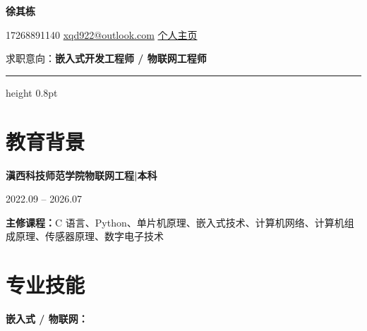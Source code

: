 \documentclass[10pt,a4paper]{article}
\begin{document}
\begin{center}
    {\fontsize{24}{28}\selectfont\bfseries\color{primary} 徐其栋}

    \vspace{0.1em}

    {\color{graytext}
    \faPhone\hspace{0.3em}17268891140
    \hspace{1.2em}
    \faEnvelope\hspace{0.3em}\href{mailto:xqd922@outlook.com}{xqd922@outlook.com}
    \hspace{1.2em}
    \faGlobe\hspace{0.3em}\href{https://1001.pp.ua}{个人主页}}

    \vspace{0.3em}

    {\color{darktext} 求职意向：\textbf{\color{primary}嵌入式开发工程师 / 物联网工程师}}
\end{center}

\vspace{0.2em}
{\color{rulecolor}\hrule height 0.8pt}

\section{\faGraduationCap\hspace{0.4em}教育背景}

{\bfseries 滇西科技师范学院}\hfill{\bfseries 物联网工程\hspace{0.3em}|\hspace{0.3em}本科}

{\color{graytext} 2022.09 -- 2026.07}

\vspace{0.2em}

{\color{darktext}\textbf{主修课程：}C 语言、Python、单片机原理、嵌入式技术、计算机网络、计算机组成原理、传感器原理、数字电子技术}

\section{\faCogs\hspace{0.4em}专业技能}

{\bfseries\color{primary}嵌入式 / 物联网：}
\end{document}
